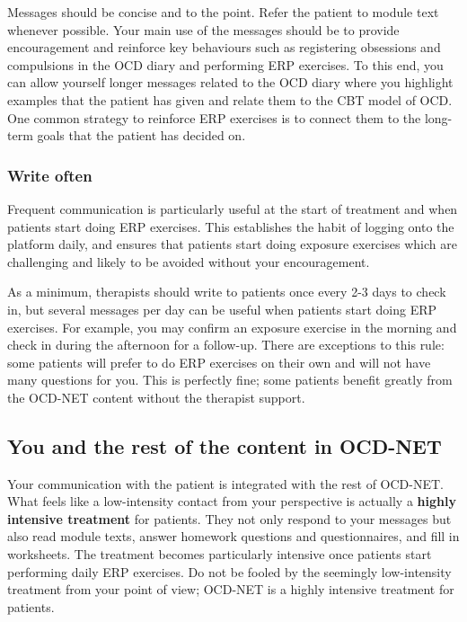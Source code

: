 \documentclass[]{book}
\theoremstyle{definition}
\theoremstyle{definition}
\theoremstyle{definition}
\theoremstyle{remark}
\begin{document}
Messages should be concise and to the point. Refer the patient to module
text whenever possible. Your main use of the messages should be to
provide encouragement and reinforce key behaviours such as registering
obsessions and compulsions in the OCD diary and performing ERP
exercises. To this end, you can allow yourself longer messages related
to the OCD diary where you highlight examples that the patient has given
and relate them to the CBT model of OCD. One common strategy to
reinforce ERP exercises is to connect them to the long-term goals that
the patient has decided on.

\hypertarget{write-often}{%
\subsubsection{Write often}\label{write-often}}

Frequent communication is particularly useful at the start of treatment
and when patients start doing ERP exercises. This establishes the habit
of logging onto the platform daily, and ensures that patients start
doing exposure exercises which are challenging and likely to be avoided
without your encouragement.

As a minimum, therapists should write to patients once every 2-3 days to
check in, but several messages per day can be useful when patients start
doing ERP exercises. For example, you may confirm an exposure exercise
in the morning and check in during the afternoon for a follow-up. There
are exceptions to this rule: some patients will prefer to do ERP
exercises on their own and will not have many questions for you. This is
perfectly fine; some patients benefit greatly from the OCD-NET content
without the therapist support.

\hypertarget{you-and-the-rest-of-the-content-in-ocd-net}{%
\subsection{You and the rest of the content in
OCD-NET}\label{you-and-the-rest-of-the-content-in-ocd-net}}

Your communication with the patient is integrated with the rest of
OCD-NET. What feels like a low-intensity contact from your perspective
is actually a \textbf{highly intensive treatment} for patients. They not
only respond to your messages but also read module texts, answer
homework questions and questionnaires, and fill in worksheets. The
treatment becomes particularly intensive once patients start performing
daily ERP exercises. Do not be fooled by the seemingly low-intensity
treatment from your point of view; OCD-NET is a highly intensive
treatment for patients.
\end{document}
